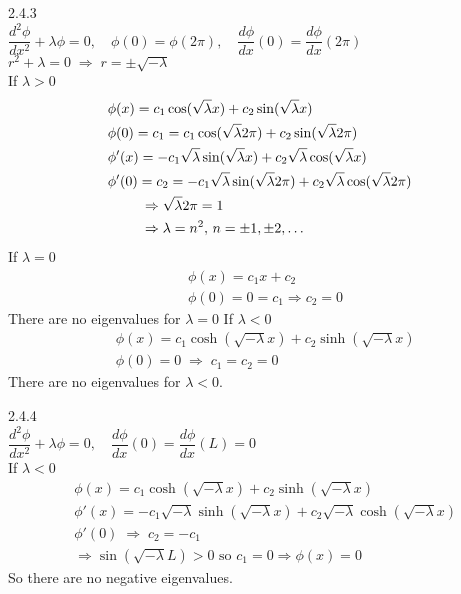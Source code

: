 \documentclass{article}
\theoremstyle{definition}
\begin{document}
    	
    \begin{prob}{2.4.3} $  $ \vspace{2mm} \\
    	$ \dfrac{d^2 \phi}{dx^2} + \lambda \phi = 0, \quad \phi(0) = \phi(2\pi)  , \quad \dfrac{d\phi}{dx}(0) = \dfrac{d\phi}{dx}(2\pi) $ \\
    	
    	$ r^2 + \lambda = 0 \; \Rightarrow \; r = \pm \sqrt{-\lambda} $ \\
    	
    	If $ \lambda > 0 $
    	\begin{align*}
    		& \phi(x) = c_1\cos(\sqrt{\lambda} x) + c_2\sin(\sqrt{\lambda} x) \\
    		& \phi(0) = c_1 = c_1\cos(\sqrt{\lambda} 2\pi) + c_2\sin(\sqrt{\lambda} 2\pi) \\
    		& \phi'(x) = -c_1\sqrt{\lambda} \sin(\sqrt{\lambda} x) + c_2\sqrt{\lambda} \cos(\sqrt{\lambda} x) \\
    		& \phi'(0) = c_2 = -c_1\sqrt{\lambda} \sin(\sqrt{\lambda} 2\pi) + c_2\sqrt{\lambda} \cos(\sqrt{\lambda} 2\pi) \\
    		& \hspace{0.84cm}  \Rightarrow \sqrt{\lambda} 2\pi = 1 \\
    		& \hspace{0.84cm} \Rightarrow \lambda = n^2 , \, n = \pm 1, \pm 2, \dots
    	\end{align*}
    	If $ \lambda = 0 $
    	\begin{align*}
    		& \phi(x) = c_1x + c_2 \\
			& \phi(0) = 0 = c_1 \Rightarrow c_2 = 0
    	\end{align*}
    	There are no eigenvalues for $ \lambda = 0 $
    	If $ \lambda < 0 $
    	\begin{align*}
    		& \phi(x) = c_1\cosh(\sqrt{-\lambda} x) + c_2\sinh(\sqrt{-\lambda} x) \\
    		& \phi(0) = 0 \; \Rightarrow \; c_1 = c_2 = 0
    	\end{align*}
    	There are no eigenvalues for $ \lambda < 0 $.
    \end{prob}

	\begin{prob}{2.4.4} $  $ \vspace{2mm} \\
		$ \dfrac{d^2 \phi}{dx^2} + \lambda \phi = 0, \quad \dfrac{d\phi}{dx}(0) = \dfrac{d\phi}{dx}(L) = 0 $ \\
		
		If $ \lambda < 0 $
		\begin{align*}
			& \phi(x) = c_1\cosh(\sqrt{-\lambda} x) + c_2 \sinh(\sqrt{-\lambda} x) \\
			& \phi'(x) = -c_1\sqrt{-\lambda} \sinh(\sqrt{-\lambda} x) + c_2 \sqrt{-\lambda} \cosh(\sqrt{-\lambda} x) \\
			& \phi'(0) \; \Rightarrow \; c_2 = -c_1 \\
			& \Rightarrow \sin(\sqrt{-\lambda} L) > 0 \text{ so } c_1 = 0 \Rightarrow \phi(x) = 0
		\end{align*}
		So there are no negative eigenvalues.
	\end{prob}
\end{document}
